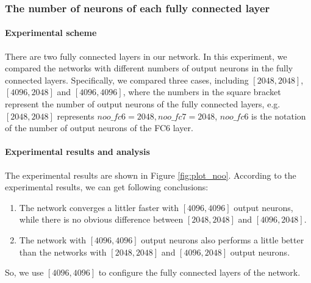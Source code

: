 \subsubsection{The number of neurons of each fully connected layer}
\paragraph{Experimental scheme}
There are two fully connected layers in our network. In this experiment, we compared the networks with different numbers of output neurons in the fully connected layers. Specifically, we compared three cases, including \([2048,2048]\), \([4096,2048]\) and \([4096,4096]\), where the numbers in the square bracket represent the number of output neurons of the fully connected layers, e.g. \([2048,2048]\) represents \(noo\_fc6 = 2048, noo\_fc7 = 2048\), \(noo\_fc6\) is the notation of the number of output neurons of the FC6 layer.

\paragraph{Experimental results and analysis}
The experimental results are shown in Figure \ref{fig:plot_noo}. According to the experimental results, we can get following conclusions:
\begin{enumerate}
	\item The network converges a littler faster with \([4096,4096]\) output neurons, while there is no obvious difference between \([2048,2048]\) and \([4096,2048]\).
	\item The network with \([4096,4096]\) output neurons also performs a little better than the networks with  \([2048,2048]\) and \([4096,2048]\) output neurons. 
\end{enumerate}
So, we  use  \([4096,4096]\) to configure the fully connected layers of the network.
 
